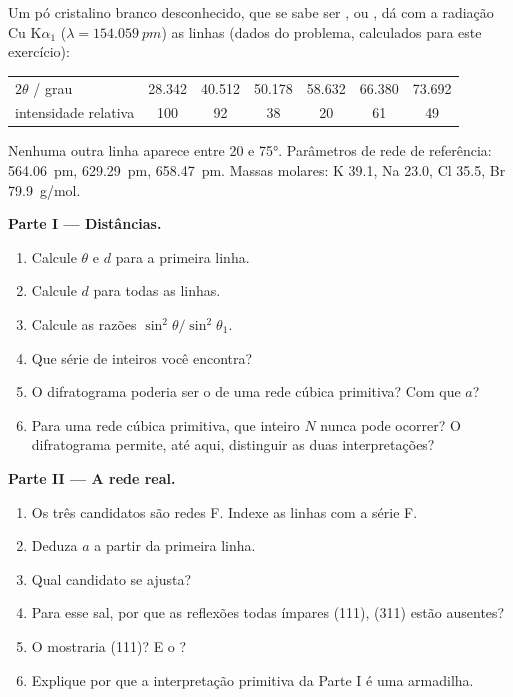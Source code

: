 \begin{problem}
\label{pb:b3:x-ray-diffraction:1}
Um pó cristalino branco desconhecido, que se sabe ser ,  ou ,
dá com a radiação Cu K$\alpha_1$ ($\lambda = \qty{154.059}{pm}$) as linhas (dados do
problema, calculados para este exercício):
\begin{center}\small
\begin{tabular}{lcccccc}
\hline
$2\theta$ / grau & 28.342 & 40.512 & 50.178 & 58.632 & 66.380 & 73.692 \\
intensidade relativa & 100 & 92 & 38 & 20 & 61 & 49 \\ \hline
\end{tabular}
\end{center}
Nenhuma outra linha aparece entre 20 e \ang{75}. Parâmetros de rede de referência:
 \qty{564.06}{pm},  \qty{629.29}{pm},  \qty{658.47}{pm}. Massas molares:
K 39.1, Na 23.0, Cl 35.5, Br \qty{79.9}{g/mol}.

\medskip\noindent\textbf{Parte I --- Distâncias.}
\begin{enumerate}
  \item Calcule $\theta$ e $d$ para a primeira linha.
  \item Calcule $d$ para todas as linhas.
  \item Calcule as razões $\sin^2\theta/\sin^2\theta_1$.
  \item Que série de inteiros você encontra?
  \item O difratograma poderia ser o de uma rede cúbica primitiva? Com que $a$?
  \item Para uma rede cúbica primitiva, que inteiro $N$ nunca pode ocorrer? O
        difratograma permite, até aqui, distinguir as duas interpretações?
\end{enumerate}

\medskip\noindent\textbf{Parte II --- A rede real.}
\begin{enumerate}[resume]
  \item Os três candidatos são redes F. Indexe as linhas com a série F.
  \item Deduza $a$ a partir da primeira linha.
  \item Qual candidato se ajusta?
  \item Para esse sal, por que as reflexões todas ímpares (111), (311) estão ausentes?
  \item O  mostraria (111)? E o ?
  \item Explique por que a interpretação primitiva da Parte I é uma armadilha.
\end{enumerate}


\end{problem}
